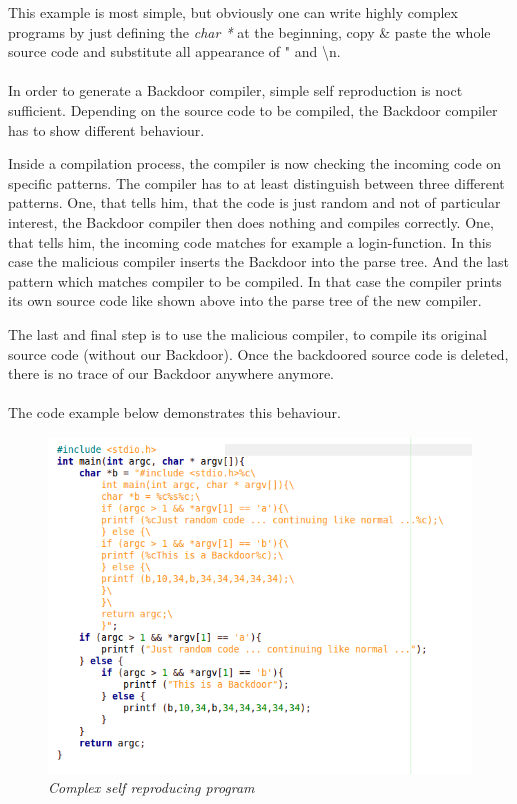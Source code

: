 \documentclass[a4paper, 12pt]{article}
\begin{document}
This example is most simple, but obviously one can write highly complex programs by just defining the \emph{char *} at the beginning, copy \& paste the whole source code and substitute all appearance of " and \textbackslash n.
\\
\\
In order to generate a Backdoor compiler, simple self reproduction is noct sufficient. Depending on the source code to be compiled, the Backdoor compiler has to show different behaviour.

Inside a compilation process, the compiler is now checking the incoming code on specific patterns. The compiler has to at least distinguish between three different patterns. One, that tells him, that the code is just random and not of particular interest, the Backdoor compiler then does nothing and compiles correctly. One, that tells him, the incoming code matches for example a login-function. In this case the malicious compiler inserts the Backdoor into the parse tree. And the last pattern which matches compiler to be compiled. In that case the compiler prints its own source code like shown above into the parse tree of the new compiler.

The last and final step is to use the malicious compiler, to compile its original source code (without our Backdoor). Once the backdoored source code is deleted, there is no trace of our Backdoor anywhere anymore.
\\
\\
The code example below demonstrates this behaviour.

\begin{figure}[h]
\begin{center}
\includegraphics[keepaspectratio=true, scale=0.8]{Complex_Self_Reproducing.png}
\end{center}
\caption{\emph{Complex self reproducing program}}
\end{figure}
\end{document}
